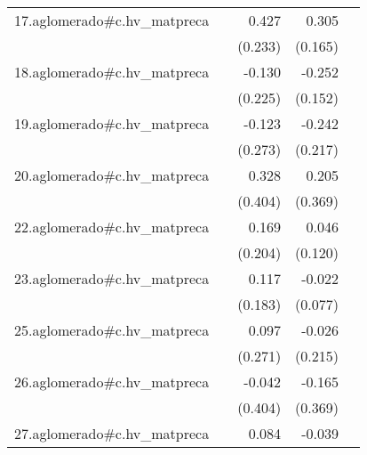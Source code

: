 {\begin{longtable}{l*{4}{D{.}{.}{-1}}}
\addlinespace
17.aglomerado#c.hv\_matpreca&                     &       0.427         &       0.305         &                     \\
            &                     &     (0.233)         &     (0.165)         &                     \\
\addlinespace
18.aglomerado#c.hv\_matpreca&                     &      -0.130         &      -0.252         &                     \\
            &                     &     (0.225)         &     (0.152)         &                     \\
\addlinespace
19.aglomerado#c.hv\_matpreca&                     &      -0.123         &      -0.242         &                     \\
            &                     &     (0.273)         &     (0.217)         &                     \\
\addlinespace
20.aglomerado#c.hv\_matpreca&                     &       0.328         &       0.205         &                     \\
            &                     &     (0.404)         &     (0.369)         &                     \\
\addlinespace
22.aglomerado#c.hv\_matpreca&                     &       0.169         &       0.046         &                     \\
            &                     &     (0.204)         &     (0.120)         &                     \\
\addlinespace
23.aglomerado#c.hv\_matpreca&                     &       0.117         &      -0.022         &                     \\
            &                     &     (0.183)         &     (0.077)         &                     \\
\addlinespace
25.aglomerado#c.hv\_matpreca&                     &       0.097         &      -0.026         &                     \\
            &                     &     (0.271)         &     (0.215)         &                     \\
\addlinespace
26.aglomerado#c.hv\_matpreca&                     &      -0.042         &      -0.165         &                     \\
            &                     &     (0.404)         &     (0.369)         &                     \\
\addlinespace
27.aglomerado#c.hv\_matpreca&                     &       0.084         &      -0.039         &                     \\

\end{longtable}}
